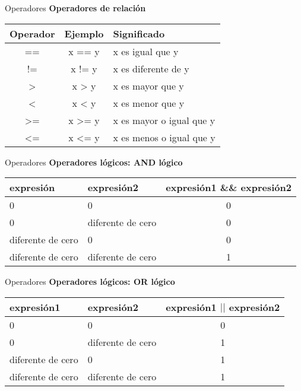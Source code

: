\begin{frame}[t]{Operadores}
\textbf{Operadores de relación}\\ \vspace{5mm}
\begin{center}
\begin{tabular}{ccl}
	\toprule
	\textbf{Operador} & \textbf{Ejemplo} & \textbf{Significado}\\
	\midrule
	== & x == y & x es igual que y \\ \hline
	!= & x != y & x es diferente de y \\ \hline
	> & x > y & x es mayor que y \\ \hline
	< & x < y & x es menor que y \\ \hline
	>= & x >= y & x es mayor o igual que y \\ \hline
	<= & x <= y & x es menos o igual que y \\ 
	\bottomrule
\end{tabular}
\end{center}
\end{frame}

\begin{frame}[t]{Operadores}
\textbf{Operadores lógicos: AND lógico}\\ \vspace{3mm}
\small
\begin{center}
\begin{tabular}{llc}
	\toprule
	\textbf{expresión} & \textbf{expresión2} & \textbf{expresión1 \&\& expresión2}\\
	\midrule \hline
	0 & 0 & 0 \\
	0 & diferente de cero & 0\\
	diferente de cero & 0 & 0\\
	diferente de cero & diferente de cero & 1\\ \hline
	\bottomrule
\end{tabular}
\end{center}
\end{frame}

\begin{frame}[t]{Operadores}
\textbf{Operadores lógicos: OR lógico}\\ \vspace{5mm}
\centering
\begin{tabular}{llc}
	\toprule
	\textbf{expresión1} & \textbf{expresión2} & \textbf{expresión1 $| |$ expresión2}\\
	\midrule \hline
	0 & 0 & 0 \\
	0 & diferente de cero & 1\\
	diferente de cero & 0 & 1\\
	diferente de cero & diferente de cero & 1\\ \hline
	\bottomrule
\end{tabular}
\end{frame}

